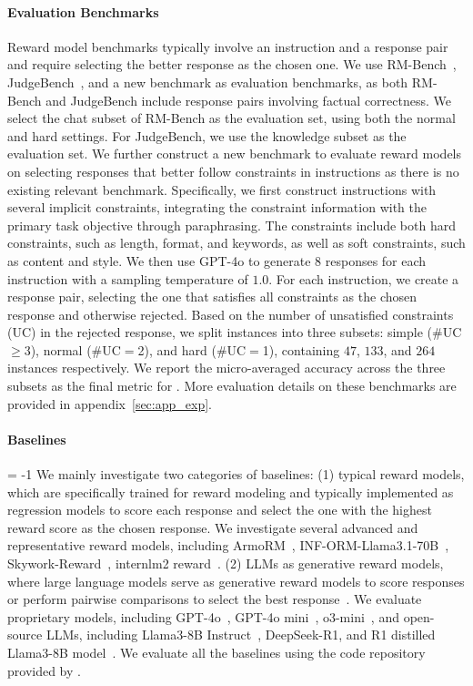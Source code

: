 \paragraph{Evaluation Benchmarks}
Reward model benchmarks typically involve an instruction and a response pair and require selecting the better response as the chosen one.
We use RM-Bench~\citep{liu2024rm}, JudgeBench~\citep{tan2024judgebench}, and a new benchmark \ourdataset as evaluation benchmarks, as both RM-Bench and JudgeBench include response pairs involving factual correctness. We select the chat subset of RM-Bench as the evaluation set, using both the normal and hard settings. For JudgeBench, we use the knowledge subset as the evaluation set.
We further construct a new benchmark \ourdataset to evaluate reward models on selecting responses that better follow constraints in instructions as there is no existing relevant benchmark.
Specifically, we first construct instructions with several implicit constraints, integrating the constraint information with the primary task objective through paraphrasing. The constraints include both hard constraints, such as length, format, and keywords, as well as soft constraints, such as content and style. We then use GPT-4o to generate $8$ responses for each instruction with a sampling temperature of $1.0$. For each instruction, we create a response pair, selecting the one that satisfies all constraints as the chosen response and otherwise rejected. Based on the number of unsatisfied constraints (UC) in the rejected response, we split \ourdataset instances into three subsets: simple (\#UC$\geq$3), normal (\#UC$=$2), and hard (\#UC$=$1),  containing $47$, $133$, and $264$ instances respectively. 
We report the micro-averaged accuracy across the three subsets as the final metric for \ourdataset. More evaluation details on these benchmarks are provided in appendix~\ref{sec:app_exp}.



\paragraph{Baselines}
\looseness = -1
We mainly investigate two categories of baselines: (1) typical reward models, which are specifically trained for reward modeling and typically implemented as regression models to score each response and select the one with the highest reward score as the chosen response. We investigate several advanced and representative reward models, including ArmoRM~\citep{wang2024interpretable}, INF-ORM-Llama3.1-70B~\citep{infly2024inf}, Skywork-Reward~\citep{liu2024skywork}, internlm2 reward~\citep{cai2024internlm2}. (2) LLMs as generative reward models, where large language models serve as generative reward models to score responses or perform pairwise comparisons to select the best response~\citep{lambert2024rewardbench}. We evaluate proprietary models, including GPT-4o~\citep{OpenAI20244o}, GPT-4o mini~\citep{OpenAI2024}, o3-mini~\citep{openai2025o3mini}, and open-source LLMs, including Llama3-8B Instruct~\citep{dubey2024llama}, 
DeepSeek-R1, and R1 distilled Llama3-8B model~\citep{guo2025deepseek}. 
We evaluate all the baselines using the code repository provided by \citet{lambert2024rewardbench}.


